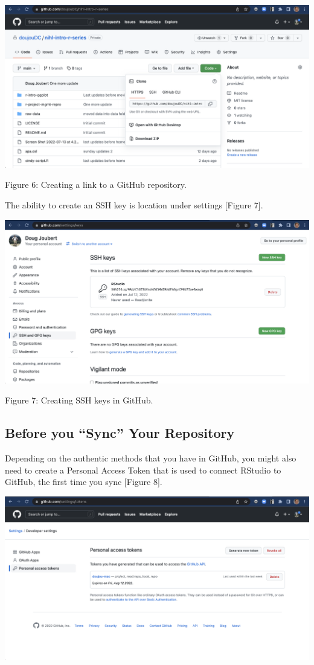 \documentclass[
]{article}
\begin{document}
\includegraphics[width=6.5in,height=\textheight]{images/git-hub-03.png}

Figure 6: Creating a link to a GitHub repository.

The ability to create an SSH key is location under settings {[}Figure
7{]}.

\includegraphics[width=6.5in,height=\textheight]{images/git-hub-05.png}

Figure 7: Creating SSH keys in GitHub.

\hypertarget{before-you-sync-your-repository}{%
\subsection{Before you ``Sync'' Your
Repository}\label{before-you-sync-your-repository}}

Depending on the authentic methods that you have in GitHub, you might
also need to create a Personal Access Token that is used to connect
RStudio to GitHub, the first time you sync {[}Figure 8{]}.

\includegraphics[width=6.5in,height=\textheight]{images/git-hub-04.png}
\end{document}
